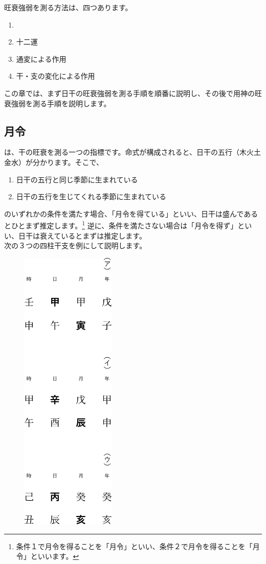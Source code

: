 \documentclass[a5paper,11pt,dvipdfmx]{tarticle}
\begin{document}
旺衰強弱を測る方法は、四つあります。

\begin{enumerate}
\item {}
\item 十二運
\item 通変による作用
\item 干・支の変化による作用
\end{enumerate}

この章では、まず日干の旺衰強弱を測る手順を順番に説明し、その後で用神の旺衰強弱を測る手順を説明します。

\subsection{月令}
は、干の旺衰を測る一つの指標です。命式が構成されると、日干の五行（木火土金水）が分かります。そこで、
\begin{enumerate}
\item 日干の五行と同じ季節に生まれている
\item 日干の五行を生じてくれる季節に生まれている
\end{enumerate}
のいずれかの条件を満たす場合、「月令を得ている」といい、日干は盛んであるとひとまず推定します。\footnote{条件１で月令を得ることを「月令」といい、条件２で月令を得ることを「月令」といいます。}
逆に、条件を満たさない場合は「月令を得ず」といい、日干は衰えているとまずは推定します。\\

次の３つの四柱干支を例にして説明します。

\begin{figure}[h]
  \includegraphics[width=45mm,angle=90]{figs/figure6-1.eps}
\end{figure}
\end{document}
